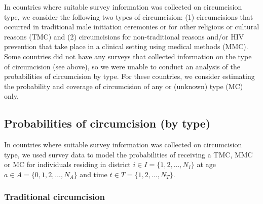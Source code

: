 \documentclass{article}
\begin{document}
\begin{appendix}
In countries where suitable survey information was collected on circumcision type, we consider the following two types of circumcision: (1) circumcisions that occurred in traditional male initiation ceremonies or for other religious or cultural reasons (TMC) and (2) circumcisions for non-traditional reasons and/or HIV prevention that take place in a clinical setting using medical methods (MMC). Some countries did not have any surveys that collected information on the type of circumcision (see above), so we were unable to conduct an analysis of the probabilities of circumcision by type. For these countries, we consider estimating the probability and coverage of circumcision of any or (unknown) type (MC) only. 


\subsection{Probabilities of circumcision (by type)}
\label{sec::bytype}


In countries where suitable survey information was collected on circumcision type, we used survey data to model the probabilities of receiving a TMC, MMC or MC for individuals residing in district $i \in I = \{1, 2, \ldots, N_I\}$ at age $a \in A = \{0, 1, 2, \ldots, N_A\}$ and time $t \in T = \{1, 2, \ldots, N_T\}$. 


\subsubsection*{Traditional circumcision}



\end{appendix}
\end{document}
